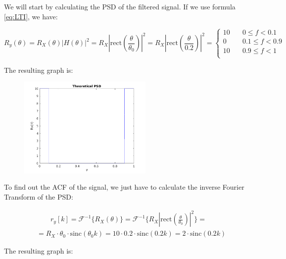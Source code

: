 \documentclass[a4paper,11pt]{article}
\begin{document}
We will start by calculating the PSD of the filtered signal. If we use formula
\eqref{eq:LTI}, we have:

\begin{equation}\label{eq:R_hd_th}
   R_y(\theta) = R_X(\theta) |H(\theta)|^2 =
   R_X |\text{rect}(\frac{\theta}{\theta_0})|^2 =
   R_X |\text{rect}(\frac{\theta}{0.2})|^2 =
   \begin{cases}
     10 &\quad 0 \le f < 0.1\\
     0 &\quad 0.1 \le f < 0.9\\
     10 &\quad 0.9 \le f < 1\\
   \end{cases}
\end{equation}

\newpage

The resulting graph is:

\begin{figure}[!hp]
    \begin{center}
      \includegraphics[width=0.58\textwidth]{images/study1/R_hd_th.png}
    \end{center}
\end{figure}

To find out the ACF of the signal, we just have to calculate the inverse Fourier
Transform of the PSD:

\begin{equation}\label{eq:r_hd_th}
  \begin{split}
   & \qquad r_y[k] = \mathcal{F}^{-1}\{R_X(\theta)\} =
   \mathcal{F}^{-1}\{R_X|\text{rect}(\frac{\theta}{\theta_0})|^2\} = \\
   & = R_X\cdot\theta_0\cdot \text{sinc}(\theta_0 k) =
   10\cdot0.2\cdot \text{sinc}(0.2 k) = 2\cdot \text{sinc}(0.2 k)
 \end{split}
 \end{equation}

The resulting graph is:
\end{document}
